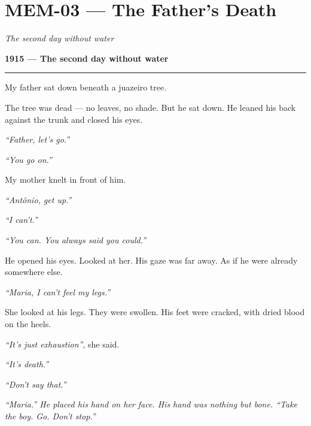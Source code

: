 \section*{\textbf{MEM-03} --- The Father's Death}

\noindent \textit{The second day without water}

\noindent \textbf{1915 --- The second day without water}

\vspace{0.5em}\noindent\rule{\textwidth}{0.5pt}\vspace{0.5em}

\noindent My father sat down beneath a juazeiro tree.

\noindent The tree was dead --- no leaves, no shade. But he sat down. He leaned his back against the trunk and closed his eyes.

\noindent \textit{\textquotedblleft{}Father, let's go.\textquotedblright{}}

\noindent \textit{\textquotedblleft{}You go on.\textquotedblright{}}

\noindent My mother knelt in front of him.

\noindent \textit{\textquotedblleft{}Antônio, get up.\textquotedblright{}}

\noindent \textit{\textquotedblleft{}I can't.\textquotedblright{}}

\noindent \textit{\textquotedblleft{}You can. You always said you could.\textquotedblright{}}

\noindent He opened his eyes. Looked at her. His gaze was far away. As if he were already somewhere else.

\noindent \textit{\textquotedblleft{}Maria, I can't feel my legs.\textquotedblright{}}

\noindent She looked at his legs. They were swollen. His feet were cracked, with dried blood on the heels.

\noindent \textit{\textquotedblleft{}It's just exhaustion\textquotedblright{}}, she said.

\noindent \textit{\textquotedblleft{}It's death.\textquotedblright{}}

\noindent \textit{\textquotedblleft{}Don't say that.\textquotedblright{}}

\noindent \textit{\textquotedblleft{}Maria.\textquotedblright{}\textit{ He placed his hand on her face. His hand was nothing but bone. }\textquotedblleft{}Take the boy. Go. Don't stop.\textquotedblright{}}

